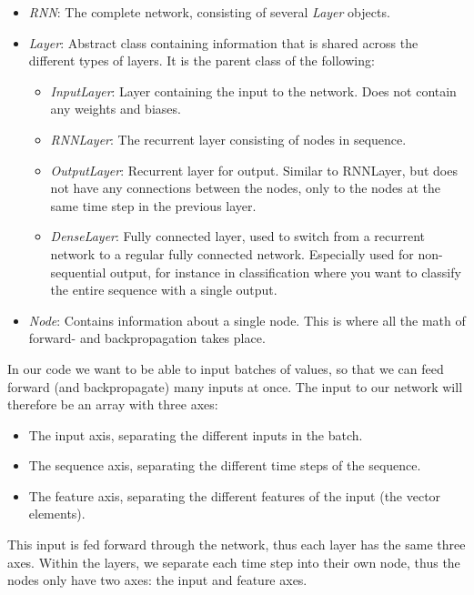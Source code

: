 \documentclass[11pt]{article}
\providecommand{\tightlist}{%
      \setlength{\itemsep}{0pt}\setlength{\parskip}{0pt}}
\begin{document}
\begin{itemize}
\tightlist
\item
  \emph{RNN}: The complete network, consisting of several \emph{Layer}
  objects.
\item
  \emph{Layer}: Abstract class containing information that is shared
  across the different types of layers. It is the parent class of the
  following:

  \begin{itemize}
  \tightlist
  \item
    \emph{InputLayer}: Layer containing the input to the network. Does
    not contain any weights and biases.
  \item
    \emph{RNNLayer}: The recurrent layer consisting of nodes in
    sequence.
  \item
    \emph{OutputLayer}: Recurrent layer for output. Similar to RNNLayer,
    but does not have any connections between the nodes, only to the
    nodes at the same time step in the previous layer.
  \item
    \emph{DenseLayer}: Fully connected layer, used to switch from a
    recurrent network to a regular fully connected network. Especially
    used for non-sequential output, for instance in classification where
    you want to classify the entire sequence with a single output.
  \end{itemize}
\item
  \emph{Node}: Contains information about a single node. This is where
  all the math of forward- and backpropagation takes place.
\end{itemize}

    In our code we want to be able to input batches of values, so that we
can feed forward (and backpropagate) many inputs at once. The input to
our network will therefore be an array with three axes:

\begin{itemize}
\tightlist
\item
  The input axis, separating the different inputs in the batch.
\item
  The sequence axis, separating the different time steps of the
  sequence.
\item
  The feature axis, separating the different features of the input (the
  vector elements).
\end{itemize}

This input is fed forward through the network, thus each layer has the
same three axes. Within the layers, we separate each time step into
their own node, thus the nodes only have two axes: the input and feature
axes.
\end{document}
